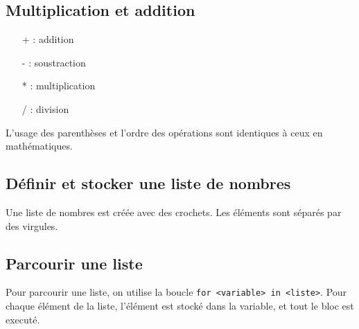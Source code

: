 \subsection*{Multiplication et addition}

\begin{multicols}{2}
	\begin{enumerate}
		\item[+] : addition
		\item[-] : soustraction
		\item[*] : multiplication
		\item[/] : division
	\end{enumerate}
	
	L'usage des parenthèses et l'ordre des opérations sont identiques à ceux en mathématiques.
		
	\columnbreak
	\centering
	\begin{minipage}{.1\textwidth}
	\end{minipage}
\end{multicols}

\subsection*{Définir et stocker une liste de nombres}

\begin{multicols}{2}
	Une liste de nombres est créée avec des crochets. Les éléments sont séparés par des virgules.

	\columnbreak
	\centering
	\begin{minipage}{.2\textwidth}
	\end{minipage}
\end{multicols}

\subsection*{Parcourir une liste}

\begin{multicols}{2}
	Pour parcourir une liste, on utilise la boucle \texttt{for <variable> in <liste>}.
	Pour chaque élément de la liste, l'élément est stocké dans la variable, et tout le bloc est executé.
	
	\columnbreak
	\centering
	\begin{minipage}{.3\textwidth}
	\end{minipage}
\end{multicols}


